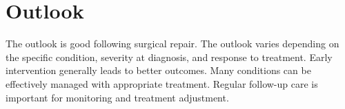 \section{Outlook}
The outlook is good following surgical repair. The outlook varies depending on the specific condition, severity at diagnosis, and response to treatment. Early intervention generally leads to better outcomes. Many conditions can be effectively managed with appropriate treatment. Regular follow-up care is important for monitoring and treatment adjustment.
